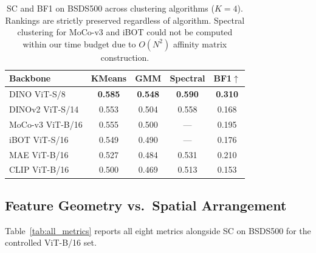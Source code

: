 \documentclass[runningheads]{llncs}
\begin{document}
\begin{table}[H]
\centering
\caption{SC and BF1 on BSDS500 across clustering algorithms ($K\!=\!4$). Rankings are strictly preserved regardless of algorithm. Spectral clustering for MoCo-v3 and iBOT could not be computed within our time budget due to $O(N^2)$ affinity matrix construction.}
\label{tab:clustering}
\begin{tabular}{lcccc}
\toprule
Backbone & KMeans & GMM & Spectral & BF1$\uparrow$ \\
\midrule
DINO ViT-S/8 & \textbf{0.585} & \textbf{0.548} & \textbf{0.590} & \textbf{0.310} \\
DINOv2 ViT-S/14 & 0.553 & 0.504 & 0.558 & 0.168 \\
MoCo-v3 ViT-B/16 & 0.555 & 0.500 & --- & 0.195 \\
iBOT ViT-S/16 & 0.549 & 0.490 & --- & 0.176 \\
MAE ViT-B/16 & 0.527 & 0.484 & 0.531 & 0.210 \\
CLIP ViT-B/16 & 0.500 & 0.469 & 0.513 & 0.153 \\
\bottomrule
\end{tabular}
\vspace{-15pt}
\end{table}

\subsection{Feature Geometry vs.\ Spatial Arrangement}
\label{sec:results}

Table~\ref{tab:all_metrics} reports all eight metrics alongside SC on BSDS500 for the controlled ViT-B/16 set.
\end{document}

